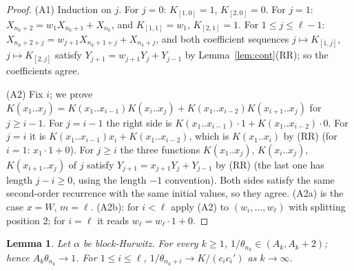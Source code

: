 \documentclass[11pt]{amsart}
\newtheorem{lemma}[theorem]{Lemma}
\theoremstyle{definition}
\theoremstyle{remark}
\begin{document}
\begin{proof}
(A1) Induction on $j$. For $j=0$: $K_{[1,0]}=1$, $K_{[2,0]}=0$. For $j=1$: $X_{n_k+2}=w_1X_{n_k+1}+X_{n_k}$, and
$K_{[1,1]}=w_1$, $K_{[2,1]}=1$. For $1\le j\le\ell-1$: $X_{n_k+2+j}=w_{j+1}X_{n_k+1+j}+X_{n_k+j}$, and both
coefficient sequences $j\mapsto K_{[1,j]}$, $j\mapsto K_{[2,j]}$ satisfy $Y_{j+1}=w_{j+1}Y_j+Y_{j-1}$ by
Lemma~\ref{lem:cont}(RR); so the coefficients agree.

(A2) Fix $i$; we prove
$K(x_1..x_j)=K(x_1..x_{i-1})K(x_i..x_j)+K(x_1..x_{i-2})K(x_{i+1}..x_j)$ for $j\ge i-1$. For $j=i-1$ the right
side is $K(x_1..x_{i-1})\cdot1+K(x_1..x_{i-2})\cdot0$. For $j=i$ it is $K(x_1..x_{i-1})x_i+K(x_1..x_{i-2})$,
which is $K(x_1..x_i)$ by (RR) (for $i=1$: $x_1\cdot1+0$). For $j\ge i$ the three functions
$K(x_1..x_j)$, $K(x_i..x_j)$, $K(x_{i+1}..x_j)$ of $j$ satisfy $Y_{j+1}=x_{j+1}Y_j+Y_{j-1}$ by (RR) (the last
one has length $j-i\ge0$, using the length $-1$ convention). Both sides satisfy the same second-order
recurrence with the same initial values, so they agree. (A2a) is the case $x=W$, $m=\ell$. (A2b): for
$i<\ell$ apply (A2) to $(w_i,\dots,w_\ell)$ with splitting position $2$; for $i=\ell$ it reads
$w_\ell=w_\ell\cdot1+0$.
\end{proof}

\begin{lemma}\label{lem:B}
Let $\alpha$ be block-Hurwitz. For every $k\ge1$, $1/\theta_{n_k}\in(A_k,A_k+2)$; hence $A_k\theta_{n_k}\to1$.
For $1\le i\le\ell$, $1/\theta_{n_k+i}\to K/(c_ic_i')$ as $k\to\infty$.
\end{lemma}
\end{document}
